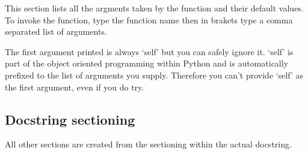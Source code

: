 This section lists all the argments taken by the function and their default values.  To invoke the function, type the function name then in brakets type a comma separated list of arguments.

The first argument printed is always `self' but you can safely ignore it.  `self' is part of the object oriented programming within Python and is automatically prefixed to the list of arguments you supply.  Therefore you can't provide `self' as the first argument, even if you do try.


\subsection{Docstring sectioning}

All other sections are created from the sectioning within the actual docstring.




